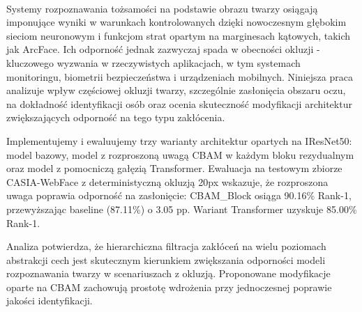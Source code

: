 \paragraph{}Systemy rozpoznawania tożsamości na podstawie obrazu twarzy osiągają imponujące wyniki w warunkach kontrolowanych dzięki nowoczesnym głębokim sieciom neuronowym i funkcjom strat opartym na marginesach kątowych, takich jak ArcFace. Ich odporność jednak zazwyczaj spada w obecności okluzji - kluczowego wyzwania w rzeczywistych aplikacjach, w tym systemach monitoringu, biometrii bezpieczeństwa i urządzeniach mobilnych. Niniejsza praca analizuje wpływ częściowej okluzji twarzy, szczególnie zasłonięcia obszaru oczu, na dokładność identyfikacji osób oraz ocenia skuteczność modyfikacji architektur zwiększających odporność na tego typu zakłócenia.

Implementujemy i ewaluujemy trzy warianty architektur opartych na IResNet50: model bazowy, model z rozproszoną uwagą CBAM w każdym bloku rezydualnym oraz model z pomocniczą gałęzią Transformer. Ewaluacja na testowym zbiorze CASIA-WebFace z deterministyczną okluzją 20px wskazuje, że rozproszona uwaga poprawia odporność na zasłonięcie: CBAM\_Block osiąga 90.16\% Rank-1, przewyższając baseline (87.11\%) o 3.05 pp. Wariant Transformer uzyskuje 85.00\% Rank-1.

Analiza potwierdza, że hierarchiczna filtracja zakłóceń na wielu poziomach abstrakcji cech jest skutecznym kierunkiem zwiększania odporności modeli rozpoznawania twarzy w scenariuszach z okluzją. Proponowane modyfikacje oparte na CBAM zachowują prostotę wdrożenia przy jednoczesnej poprawie jakości identyfikacji.
